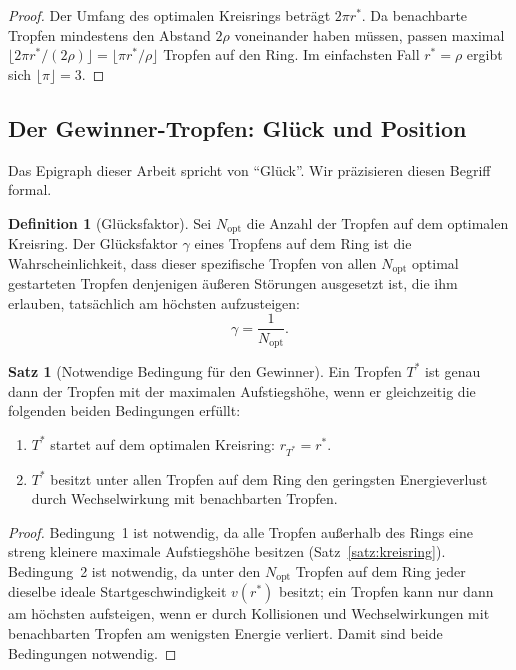 ﻿\documentclass[a4paper,12pt]{article}
\theoremstyle{definition}
\newtheorem{definition}{Definition}
\newtheorem{satz}{Satz}
\begin{document}
\begin{proof}
    Der Umfang des optimalen Kreisrings beträgt $2\pi r^*$. Da benachbarte Tropfen
    mindestens den Abstand $2\rho$ voneinander haben müssen, passen maximal
    $\lfloor 2\pi r^* / (2\rho) \rfloor = \lfloor \pi r^* / \rho \rfloor$ Tropfen
    auf den Ring. Im einfachsten Fall $r^* = \rho$ ergibt sich $\lfloor \pi \rfloor = 3$. \qedhere
\end{proof}

\subsection{Der Gewinner-Tropfen: Glück und Position}

Das Epigraph dieser Arbeit spricht von ``Glück''. Wir präzisieren diesen Begriff formal.

\begin{definition}[Glücksfaktor]
    Sei $N_{\text{opt}}$ die Anzahl der Tropfen auf dem optimalen Kreisring.
    Der Glücksfaktor $\gamma$ eines Tropfens auf dem Ring ist die Wahrscheinlichkeit,
    dass dieser spezifische Tropfen von allen $N_{\text{opt}}$ optimal gestarteten Tropfen
    denjenigen äußeren Störungen ausgesetzt ist, die ihm erlauben, tatsächlich am höchsten
    aufzusteigen:
    \[
    \gamma = \frac{1}{N_{\text{opt}}}.
    \]
\end{definition}

\begin{satz}[Notwendige Bedingung für den Gewinner]
\label{satz:gewinner}
    Ein Tropfen $T^*$ ist genau dann der Tropfen mit der maximalen Aufstiegshöhe, wenn er
    gleichzeitig die folgenden beiden Bedingungen erfüllt:
    \begin{enumerate}
        \item $T^*$ startet auf dem optimalen Kreisring: $r_{T^*} = r^*$.
        \item $T^*$ besitzt unter allen Tropfen auf dem Ring den geringsten
              Energieverlust durch Wechselwirkung mit benachbarten Tropfen.
    \end{enumerate}
\end{satz}

\begin{proof}
    Bedingung~1 ist notwendig, da alle Tropfen außerhalb des Rings eine streng kleinere
    maximale Aufstiegshöhe besitzen (Satz~\ref{satz:kreisring}). Bedingung~2 ist notwendig,
    da unter den $N_{\text{opt}}$ Tropfen auf dem Ring jeder dieselbe ideale Startgeschwindigkeit
    $v(r^*)$ besitzt; ein Tropfen kann nur dann am höchsten aufsteigen, wenn er durch
    Kollisionen und Wechselwirkungen mit benachbarten Tropfen am wenigsten Energie verliert.
    Damit sind beide Bedingungen notwendig. \qedhere
\end{proof}
\end{document}
